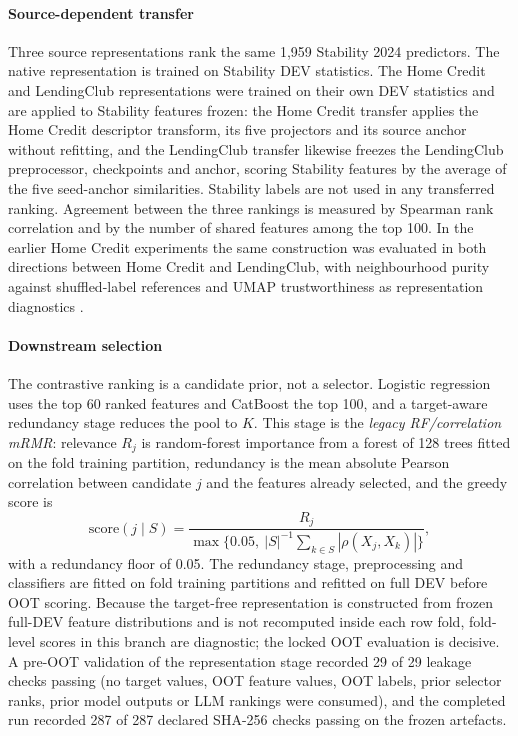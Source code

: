\documentclass[preprint,12pt]{elsarticle}
\newcommand{\Kfeat}{K}
\begin{document}
\paragraph{Source-dependent transfer}
Three source representations rank the same 1,959 Stability 2024 predictors. The native representation is trained on Stability DEV statistics. The Home Credit and LendingClub representations were trained on their own DEV statistics and are applied to Stability features frozen: the Home Credit transfer applies the Home Credit descriptor transform, its five projectors and its source anchor without refitting, and the LendingClub transfer likewise freezes the LendingClub preprocessor, checkpoints and anchor, scoring Stability features by the average of the five seed-anchor similarities. Stability labels are not used in any transferred ranking. Agreement between the three rankings is measured by Spearman rank correlation \cite{spearman1904} and by the number of shared features among the top 100. In the earlier Home Credit experiments the same construction was evaluated in both directions between Home Credit and LendingClub, with neighbourhood purity against shuffled-label references and UMAP trustworthiness as representation diagnostics \cite{mcinnes2018,venna2001}.

\paragraph{Downstream selection}
The contrastive ranking is a candidate prior, not a selector. Logistic regression uses the top 60 ranked features and CatBoost the top 100, and a target-aware redundancy stage reduces the pool to $\Kfeat$. This stage is the \emph{legacy RF/correlation mRMR}: relevance $R_j$ is random-forest importance from a forest of 128 trees fitted on the fold training partition, redundancy is the mean absolute Pearson correlation between candidate $j$ and the features already selected, and the greedy score is
\begin{equation}
    \mathrm{score}(j\mid S)=\frac{R_j}{\max\{0.05,\ |S|^{-1}\sum_{k\in S}|\rho(X_j,X_k)|\}},
    \label{eq:legacy_mrmr}
\end{equation}
with a redundancy floor of 0.05. The redundancy stage, preprocessing and classifiers are fitted on fold training partitions and refitted on full DEV before OOT scoring. Because the target-free representation is constructed from frozen full-DEV feature distributions and is not recomputed inside each row fold, fold-level scores in this branch are diagnostic; the locked OOT evaluation is decisive. A pre-OOT validation of the representation stage recorded 29 of 29 leakage checks passing (no target values, OOT feature values, OOT labels, prior selector ranks, prior model outputs or LLM rankings were consumed), and the completed run recorded 287 of 287 declared SHA-256 checks passing on the frozen artefacts.
\end{document}
